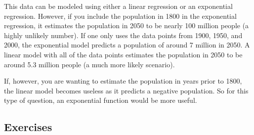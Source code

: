 \documentclass[
]{book}
\theoremstyle{definition}
\theoremstyle{definition}
\theoremstyle{definition}
\theoremstyle{definition}
\theoremstyle{remark}
\begin{document}
This data can be modeled using either a linear regression or an exponential regression. However, if you include the population in 1800 in the exponential regression, it estimates the population in 2050 to be nearly 100 million people (a highly unlikely number). If one only uses the data points from 1900, 1950, and 2000, the exponential model predicts a population of around 7 million in 2050. A linear model with all of the data points estimates the population in 2050 to be around 5.3 million people (a much more likely scenario).

If, however, you are wanting to estimate the population in years prior to 1800, the linear model becomes useless as it predicts a negative population. So for this type of question, an exponential function would be more useful.

\hypertarget{exercises-29}{%
\subsection{Exercises}\label{exercises-29}}
\end{document}
